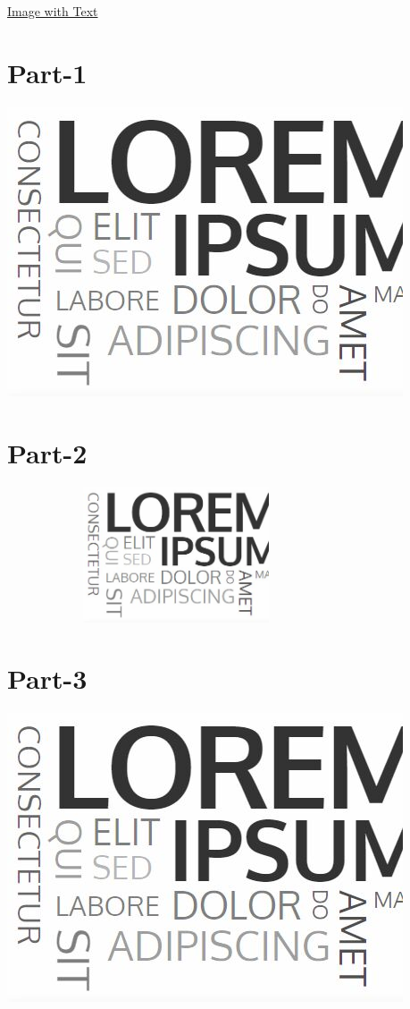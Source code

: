 \documentclass{article}
\begin{document}
\begin{center}
    \Large \underline {Image with Text}
\end{center}

\section{Part-1}
\includegraphics[scale=1.2]{Lorem.jpg} %

\section{Part-2}
\includegraphics[width=10cm, height=4cm]{Lorem.jpg}

\section{Part-3} %
\includegraphics[scale=0.5, angle=45]{Lorem}
\end{document}
